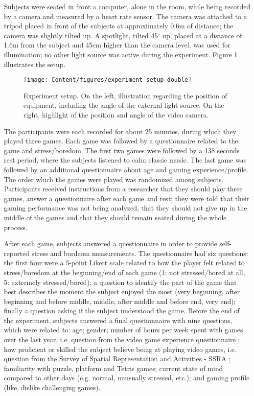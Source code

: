 Subjects were seated in front a computer, alone in the room, while being recorded by a camera and measured by a heart rate sensor. The camera was attached to a tripod placed in front of the subjects at approximately 0.6m of distance; the camera was slightly tilted up. A spotlight, tilted 45$^{\circ}$ up, placed at a distance of 1.6m from the subject and 45cm higher than the camera level, was used for illumination; no other light source was active during the experiment. Figure \ref{fig:setup} illustrates the setup.

\begin{figure}[h]
\centering
\texttt{[image: Content/figures/experiment-setup-double]}
\caption{Experiment setup. On the left, illustration regarding the position of equipment, including the angle of the external light source. On the right, highlight of the position and angle of the video camera.}
\label{fig:setup}
\end{figure}

The participants were each recorded for about 25 minutes, during which they played three games. Each game was followed by a questionnaire related to the game and stress/boredom. The first two games were followed by a 138 seconds rest period, where the subjects listened to calm classic music. The last game was followed by an additional questionnaire about age and gaming experience/profile. The order which the games were played was randomized among subjects. Participants received instructions from a researcher that they should play three games, answer a questionnaire after each game and rest; they were told that their gaming performance was not being analyzed, that they should not give up in the middle of the games and that they should remain seated during the whole process.

After each game, subjects answered a questionnaire in order to provide self-reported stress and bordeom measurements. The questionnaire had six questions: the first four were a 5-point Likert scale related to how the player felt related to stress/boredom at the beginning/end of each game (1: not stressed/bored at all, 5: extremely stressed/bored); a question to identify the part of the game that best describes the moment the subject enjoyed the most (very beginning, after beginning and before middle, middle, after middle and before end, very end); finally a question asking if the subject understood the game. Before the end of the experiment, subjects answered a final questionnaire with nine questions, which were related to: age; gender; number of hours per week spent with games over the last year, i.e. question from the video game experience questionnaire \parencite{unsworth2015playing}; how proficient or skilled the subject believe being at playing video games, i.e. question from the Survey of Spatial Representation and Activities - SSRA \parencite{terlecki2005important}; familiarity with puzzle, platform and Tetris games; current state of mind compared to other days (e.g. normal, unusually stressed, etc.); and gaming profile (like, dislike challenging games).

